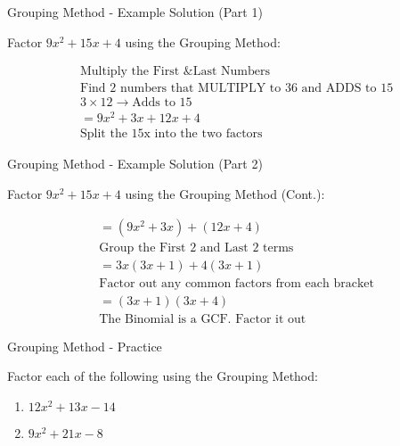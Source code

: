 \documentclass[aspectratio=169]{beamer}
\begin{document}
\begin{frame}{Grouping Method - Example Solution (Part 1)}
    \begin{tcolorbox}[colback=lightgray,colframe=accent,title=Detailed Solution]
        \footnotesize
        Factor $9x^2 + 15x + 4$ using the Grouping Method:
        
        \begin{align*}
            & \text{Multiply the First \& Last Numbers} \\
            & \text{Find 2 numbers that MULTIPLY to 36 and ADDS to 15} \\
            & 3 \times 12 \rightarrow \text{Adds to 15} \\
            &= 9x^2 + 3x + 12x + 4 \\
            & \text{Split the 15x into the two factors}
        \end{align*}
    \end{tcolorbox}
\end{frame}

\begin{frame}{Grouping Method - Example Solution (Part 2)}
    \begin{tcolorbox}[colback=lightgray,colframe=accent,title=Detailed Solution (Cont.)]
        \footnotesize
        Factor $9x^2 + 15x + 4$ using the Grouping Method (Cont.):
        
        \begin{align*}
            &= (9x^2 + 3x) + (12x + 4) \\
            & \text{Group the First 2 and Last 2 terms} \\
            &= 3x(3x + 1) + 4(3x + 1) \\
            & \text{Factor out any common factors from each bracket} \\
            &= (3x + 1)(3x + 4) \\
            & \text{The Binomial is a GCF. Factor it out}
        \end{align*}
    \end{tcolorbox}
\end{frame}

\begin{frame}{Grouping Method - Practice}
    \begin{tcolorbox}[colback=lightgray,colframe=primary,title=Practice: Factor using Grouping Method]
        \footnotesize
        Factor each of the following using the Grouping Method:
        \begin{enumerate}
            \setlength{\itemsep}{0.5em}
            \item $12x^2 + 13x - 14$
            \item $9x^2 + 21x - 8$
        \end{enumerate}
    \end{tcolorbox}
\end{frame}
\end{document}
